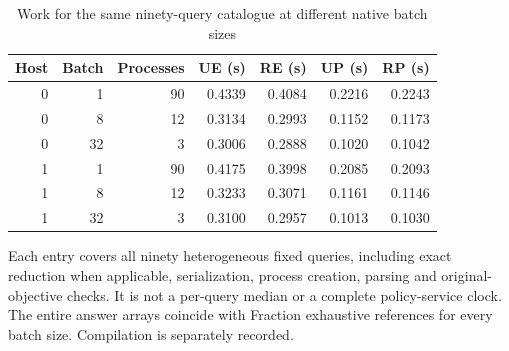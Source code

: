 \begin{table}[htbp]
\centering
\caption{Work for the same ninety-query catalogue at different native batch sizes}\label{tab:batch61}
{\small\setlength{\tabcolsep}{3pt}
\begin{tabular}{rrrrrrr}
\hline
Host & Batch & Processes & UE (s) & RE (s) & UP (s) & RP (s) \\
\hline
0 & 1 & 90 & 0.4339 & 0.4084 & 0.2216 & 0.2243 \\
0 & 8 & 12 & 0.3134 & 0.2993 & 0.1152 & 0.1173 \\
0 & 32 & 3 & 0.3006 & 0.2888 & 0.1020 & 0.1042 \\
1 & 1 & 90 & 0.4175 & 0.3998 & 0.2085 & 0.2093 \\
1 & 8 & 12 & 0.3233 & 0.3071 & 0.1161 & 0.1146 \\
1 & 32 & 3 & 0.3100 & 0.2957 & 0.1013 & 0.1030 \\
\hline\end{tabular}}
\par\smallskip
{\footnotesize Each entry covers all ninety heterogeneous fixed queries, including exact reduction when applicable, serialization, process creation, parsing and original-objective checks. It is not a per-query median or a complete policy-service clock. The entire answer arrays coincide with Fraction exhaustive references for every batch size. Compilation is separately recorded.}
\end{table}
